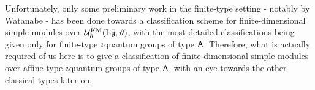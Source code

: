         Unfortunately, only some preliminary work in the finite-type setting - notably by Watanabe - has been done towards a classification scheme for finite-dimensional simple modules over $\mathcal{U}_{\hbar}^{\mathrm{KM}}(\mathrm{L} \bar{\mathfrak{g}}, \vartheta)$, with the most detailed classifications being given only for finite-type $\imath$quantum groups of type $\mathsf{A}$. Therefore, what is actually required of us here is to give a classification of finite-dimensional simple modules over affine-type $\imath$quantum groups of type $\mathsf{A}$, with an eye towards the other classical types later on.